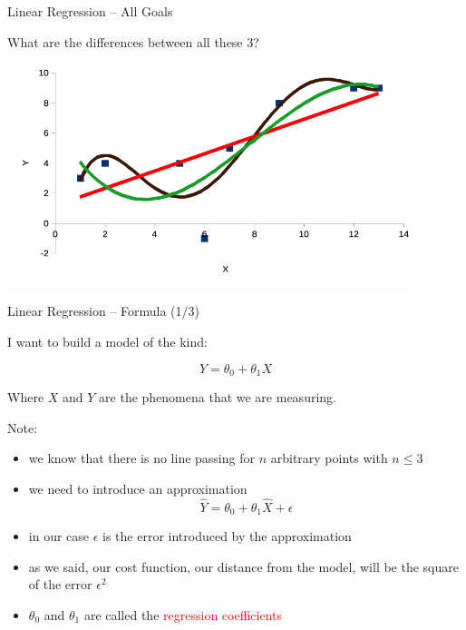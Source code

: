\documentclass{beamer}
\begin{document}
\begin{frame}
{\centerline{Linear Regression -- All Goals}}

What are the differences between all these 3?

\begin{center}
\includegraphics[width=12cm]{P2023.AIBCCSS.FoundationsDataScience/LinearRegression_O35.png}
\end{center}

\end{frame}




\begin{frame}
{\centerline{Linear Regression -- Formula (1/3)}}
I want to build a model of the kind:

$$ Y = \theta_0 + \theta_1 X $$

Where $X$ and $Y$ are the phenomena that we are measuring.\\
\vspace*{0.3cm}

Note:
\begin{itemize}
\item we know that there is no line passing for $n$ arbitrary points with $n \leq 3$
\item we need to introduce an approximation
$$ \hat{Y} = \theta_0 + \theta_1 \hat{X} + \epsilon $$
\item in our case $\epsilon$ is the error introduced by the approximation
\item as we said, our cost function, our distance from the model, will be the square of the error $\epsilon^2$
\item $ \theta_0$ and $\theta_1$ are called the \textcolor{red}{regression coefficients}
\end{itemize}

\end{frame}
\end{document}
